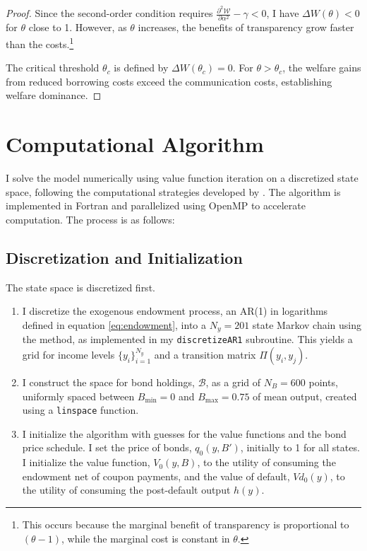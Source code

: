 \documentclass[12pt]{article}
\theoremstyle{plain}
\begin{document}
\begin{proof}
	Since the second-order condition requires $\frac{\partial^2
			\mathcal{W}}{\partial \alpha^2} - \gamma < 0$, I have $\Delta W(\theta) < 0$
	for $\theta$ close to 1. However, as $\theta$ increases, the benefits of
	transparency grow faster than the costs.\footnote{This occurs because the
		marginal benefit of transparency is proportional to $(\theta-1)$, while the
		marginal cost is constant in $\theta$.}

	The critical threshold $\theta_c$ is defined by $\Delta W(\theta_c) = 0$. For
	$\theta > \theta_c$, the welfare gains from reduced borrowing costs exceed the
	communication costs, establishing welfare dominance.
\end{proof}

\clearpage

\section{Computational Algorithm}\label{app:computations}

I solve the model numerically using value function iteration on a discretized
state space, following the computational strategies developed by
\citep{MIHALACHEOREEF2024}. The algorithm is implemented in Fortran and
parallelized using OpenMP to accelerate computation. The process is as follows:

\subsection{Discretization and Initialization}
The state space is discretized first.
\begin{enumerate}
	\item I discretize the exogenous endowment process, an AR(1) in logarithms defined in
	      equation \eqref{eq:endowment}, into a $N_y=201$ state Markov chain using the
	      \citep{Tauchen1986} method, as implemented in my \texttt{discretizeAR1}
	      subroutine. This yields a grid for income levels $\{y_i\}_{i=1}^{N_y}$ and a
	      transition matrix $\Pi(y_i, y_j)$.
	\item I construct the space for bond holdings, $\mathcal{B}$, as a grid of $N_B =
		      600$ points, uniformly spaced between $B_{\min}=0$ and $B_{\max}=0.75$ of mean
	      output, created using a \texttt{linspace} function.
	\item I initialize the algorithm with guesses for the value functions and the bond
	      price schedule. I set the price of bonds, $q_0(y, B')$, initially to 1 for all
	      states. I initialize the value function, $V_0(y, B)$, to the utility of
	      consuming the endowment net of coupon payments, and the value of default,
	      $Vd_0(y)$, to the utility of consuming the post-default output $h(y)$.
\end{enumerate}
\end{document}
